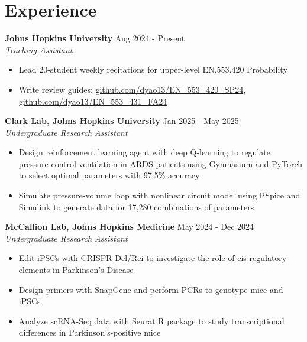 \documentclass[11pt]{article}       %
\begin{document}
\vspace{-9pt}

\section*{Experience}
\textbf{Johns Hopkins University} \hfill Aug 2024 - Present \\
\textit{Teaching Assistant} \vspace{-9pt} \\
\begin{itemize}
  \item Lead 20-student weekly recitations for upper-level EN.553.420 Probability
  \item Write review guides: \href{https://github.com/dyao13/EN_553_420_SP24}{github.com/dyao13/EN\_553\_420\_SP24}, \href{https://github.com/dyao13/EN_553_431_FA24}{github.com/dyao13/EN\_553\_431\_FA24}
\end{itemize}

\textbf{Clark Lab, Johns Hopkins University} \hfill Jan 2025 - May 2025 \\
\textit{Undergraduate Research Assistant} \vspace{-9pt} \\
\begin{itemize}
  \item Design reinforcement learning agent with deep Q-learning to regulate pressure-control ventilation in ARDS patients using Gymnasium and PyTorch to select optimal parameters with 97.5\% accuracy
  \item Simulate pressure-volume loop with nonlinear circuit model using PSpice and Simulink to generate data for 17,280 combinations of parameters
\end{itemize}

\textbf{McCallion Lab, Johns Hopkins Medicine} \hfill May 2024 - Dec 2024 \\
\textit{Undergraduate Research Assistant} \vspace{-9pt} \\
\begin{itemize}
  \item Edit iPSCs with CRISPR Del/Rei to investigate the role of cis-regulatory elements in Parkinson's Disease
  \item Design primers with SnapGene and perform PCRs to genotype mice and iPSCs
  \item Analyze scRNA-Seq data with Seurat R package to study transcriptional differences in Parkinson's-positive mice
\end{itemize}
\end{document}
